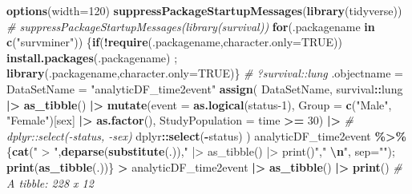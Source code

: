 \documentclass[
]{article}
\newenvironment{Shaded}{\begin{snugshade}}{\end{snugshade}}
\newcommand{\AttributeTok}[1]{\textcolor[rgb]{0.13,0.29,0.53}{#1}}
\newcommand{\CommentTok}[1]{\textcolor[rgb]{0.56,0.35,0.01}{\textit{#1}}}
\newcommand{\ConstantTok}[1]{\textcolor[rgb]{0.56,0.35,0.01}{#1}}
\newcommand{\ControlFlowTok}[1]{\textcolor[rgb]{0.13,0.29,0.53}{\textbf{#1}}}
\newcommand{\DecValTok}[1]{\textcolor[rgb]{0.00,0.00,0.81}{#1}}
\newcommand{\FunctionTok}[1]{\textcolor[rgb]{0.13,0.29,0.53}{\textbf{#1}}}
\newcommand{\NormalTok}[1]{#1}
\newcommand{\OtherTok}[1]{\textcolor[rgb]{0.56,0.35,0.01}{#1}}
\newcommand{\SpecialCharTok}[1]{\textcolor[rgb]{0.81,0.36,0.00}{\textbf{#1}}}
\newcommand{\StringTok}[1]{\textcolor[rgb]{0.31,0.60,0.02}{#1}}
\begin{document}
\begin{Shaded}
\begin{Highlighting}[]
\FunctionTok{options}\NormalTok{(}\AttributeTok{width=}\DecValTok{120}\NormalTok{)}
\FunctionTok{suppressPackageStartupMessages}\NormalTok{(}\FunctionTok{library}\NormalTok{(tidyverse))}
\CommentTok{\# suppressPackageStartupMessages(library(survival))}
\ControlFlowTok{for}\NormalTok{(.packagename }\ControlFlowTok{in} \FunctionTok{c}\NormalTok{(}\StringTok{"survminer"}\NormalTok{)) \{}\ControlFlowTok{if}\NormalTok{(}\SpecialCharTok{!}\FunctionTok{require}\NormalTok{(.packagename,}\AttributeTok{character.only=}\ConstantTok{TRUE}\NormalTok{)) }\FunctionTok{install.packages}\NormalTok{(.packagename)  ;  }\FunctionTok{library}\NormalTok{(.packagename,}\AttributeTok{character.only=}\ConstantTok{TRUE}\NormalTok{)\}  }
\CommentTok{\# ?survival::lung}
\NormalTok{.objectname }\OtherTok{=}\NormalTok{ DataSetName }\OtherTok{=} \StringTok{"analyticDF\_time2event"}
\FunctionTok{assign}\NormalTok{(}
\NormalTok{    DataSetName, }
\NormalTok{    survival}\SpecialCharTok{::}\NormalTok{lung }\SpecialCharTok{|\textgreater{}} \FunctionTok{as\_tibble}\NormalTok{() }\SpecialCharTok{|\textgreater{}} \FunctionTok{mutate}\NormalTok{(}\AttributeTok{event =} \FunctionTok{as.logical}\NormalTok{(status}\DecValTok{{-}1}\NormalTok{), }\AttributeTok{Group =} \FunctionTok{c}\NormalTok{(}\StringTok{"Male"}\NormalTok{, }\StringTok{"Female"}\NormalTok{)[sex] }\SpecialCharTok{|\textgreater{}} \FunctionTok{as.factor}\NormalTok{(), }\AttributeTok{StudyPopulation =}\NormalTok{ time }\SpecialCharTok{\textgreater{}=} \DecValTok{30}\NormalTok{) }\SpecialCharTok{|\textgreater{}}
        \CommentTok{\# dplyr::select({-}status, {-}sex)}
\NormalTok{        dplyr}\SpecialCharTok{::}\FunctionTok{select}\NormalTok{(}\SpecialCharTok{{-}}\NormalTok{status)}
\NormalTok{)}
\NormalTok{analyticDF\_time2event }\SpecialCharTok{\%\textgreater{}\%}\NormalTok{ \{}\FunctionTok{cat}\NormalTok{(}\StringTok{" \textgreater{} "}\NormalTok{,}\FunctionTok{deparse}\NormalTok{(}\FunctionTok{substitute}\NormalTok{(.)),}\StringTok{" |\textgreater{} as\_tibble() |\textgreater{} print()"}\NormalTok{,}\StringTok{"  }\SpecialCharTok{\textbackslash{}n}\StringTok{"}\NormalTok{, }\AttributeTok{sep=}\StringTok{""}\NormalTok{); }\FunctionTok{print}\NormalTok{(}\FunctionTok{as\_tibble}\NormalTok{(.))\}}
 \SpecialCharTok{\textgreater{}}\NormalTok{ analyticDF\_time2event }\SpecialCharTok{|\textgreater{}} \FunctionTok{as\_tibble}\NormalTok{() }\SpecialCharTok{|\textgreater{}} \FunctionTok{print}\NormalTok{()  }
\CommentTok{\# A tibble: 228 x 12}

\end{Highlighting}
\end{Shaded}
\end{document}
